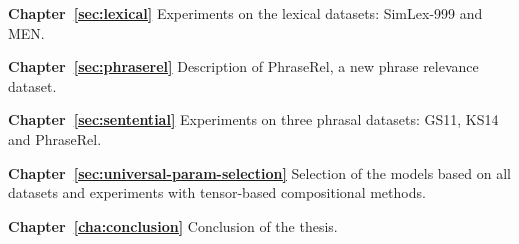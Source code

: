 \textbf{Chapter~\ref{sec:lexical}} Experiments on the lexical datasets: SimLex-999 and MEN.

\textbf{Chapter~\ref{sec:phraserel}} Description of PhraseRel, a new phrase relevance dataset.

\textbf{Chapter~\ref{sec:sentential}} Experiments on three phrasal datasets: GS11, KS14 and PhraseRel.

\textbf{Chapter~\ref{sec:universal-param-selection}} Selection of the models based on all datasets and experiments with tensor-based compositional methods.

\textbf{Chapter~\ref{cha:conclusion}} Conclusion of the thesis.

